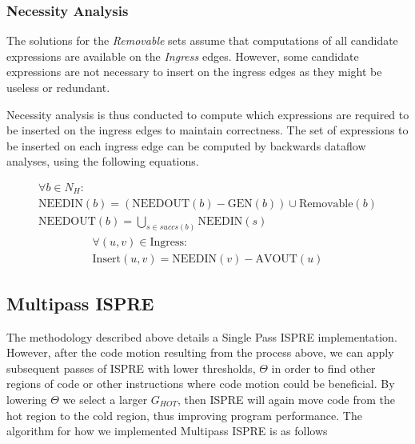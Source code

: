 \documentclass[sigplan,screen]{acmart}
\begin{document}
    \subsubsection{Necessity Analysis}
    
    The solutions for the \emph{Removable} sets assume that computations of all candidate expressions are available on the \emph{Ingress} edges. However, some candidate expressions are not necessary to insert on the ingress edges as they might be useless or redundant. 

    Necessity analysis is thus conducted to compute which expressions are required to be inserted on the ingress edges to maintain correctness. The set of expressions to be inserted on each ingress edge can be computed by backwards dataflow analyses, using the following equations.

    \begin{multline*}
    \forall b \in N_H:\\
    \textrm{NEEDIN}(b) = (\textrm{NEEDOUT}(b) - \textrm{GEN}(b)) \cup \textrm{Removable}(b)\\
    \textrm{NEEDOUT}(b) = \underset{s \in succs(b)}{\bigcup} \textrm{NEEDIN}(s)
    \end{multline*}
    \begin{multline*}
    \forall (u,v) \in \textrm{Ingress}:\\  
    \textrm{Insert}(u,v) = \textrm{NEEDIN}(v) - \textrm{AVOUT}(u)
    \end{multline*}

    \subsection{Multipass ISPRE}
    The methodology described above details a Single Pass ISPRE implementation. However, after the code motion resulting from the process above, we can apply subsequent passes of ISPRE with lower thresholds, \(\Theta\) in order to find other regions of code or other instructions where code motion could be beneficial. By lowering \(\Theta\) we select a larger \(G_{HOT}\), then ISPRE will again move code from the hot region to the cold region, thus improving program performance. The algorithm for how we implemented Multipass ISPRE is as follows 
    \begin{algorithm}[]
\caption{Multipass ISPRE}}\label{alg:cap}
   \begin{algorithmic}
   \STATE $\Theta \gets \text{0.9 * } \textit{maximum block count}$
   \STATE $passCount \gets 0$
   \REPEAT
   \STATE \textit{ISPRE}\textbf{ (CFG) }
   \STATE $\Theta \gets \Theta / 2$
   \STATE $passCount \gets passCount + 1$
   \UNTIL{$passCount = \text{number of desired iterations}$}
    \end{algorithmic}
    \end{algorithm}
\end{document}
